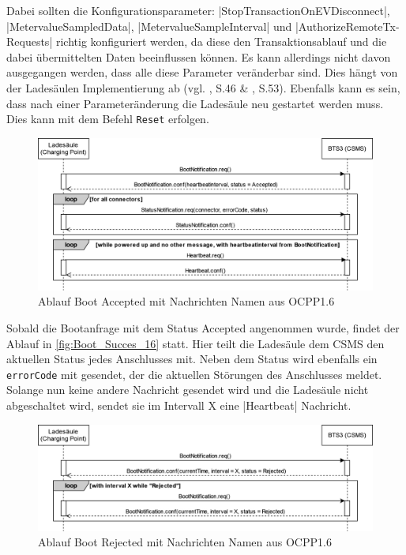 \noindent Dabei sollten die Konfigurationsparameter: 
\spverb|StopTransactionOnEVDisconnect|, \\ \spverb|MetervalueSampledData|, \spverb|MetervalueSampleInterval| und \spverb|AuthorizeRemoteTx- Requests| richtig konfiguriert werden, da diese den Transaktionsablauf und die dabei übermittelten Daten beeinflussen können. Es kann allerdings nicht davon ausgegangen werden, dass alle diese Parameter veränderbar sind. Dies hängt von der Ladesäulen Implementierung ab (vgl. \cite{OCPP-1.6-edition-2}, S.46 \& \cite{OCPP-2.0.1-part2-specification-edition2}, S.53). Ebenfalls kann es sein, dass nach einer Parameteränderung die Ladesäule neu gestartet werden muss. Dies kann mit dem Befehl \verb|Reset| erfolgen.

\begin{figure}[H]
	\centering
	\includegraphics[width=1.0\textwidth]{images/OCPP/Boot_Success_16.drawio.png}
	\caption{Ablauf Boot Accepted mit Nachrichten Namen aus OCPP1.6 \cite{Eigene_Darstellung, OCPP-1.6-edition-2}}
	\label{fig:Boot_Succes_16}
\end{figure}

\noindent Sobald die Bootanfrage mit dem Status Accepted angenommen wurde, findet der Ablauf in \autoref{fig:Boot_Succes_16} statt. Hier teilt die Ladesäule dem \acs{CSMS} den aktuellen Status jedes Anschlusses mit. Neben dem Status wird ebenfalls ein \verb|errorCode| mit gesendet, der die aktuellen Störungen des Anschlusses meldet. Solange nun keine andere Nachricht gesendet wird und die Ladesäule nicht abgeschaltet wird, sendet sie im Intervall X eine \spverb|Heartbeat| Nachricht.

\begin{figure}[H]
	\centering
	\includegraphics[width=1.0\textwidth]{images/OCPP/Boot_Rejected_16.drawio.png}
	\caption{Ablauf Boot Rejected mit Nachrichten Namen aus OCPP1.6 \cite{Eigene_Darstellung, OCPP-1.6-edition-2}}
	\label{fig:Boot_Rejected_16}
\end{figure}

